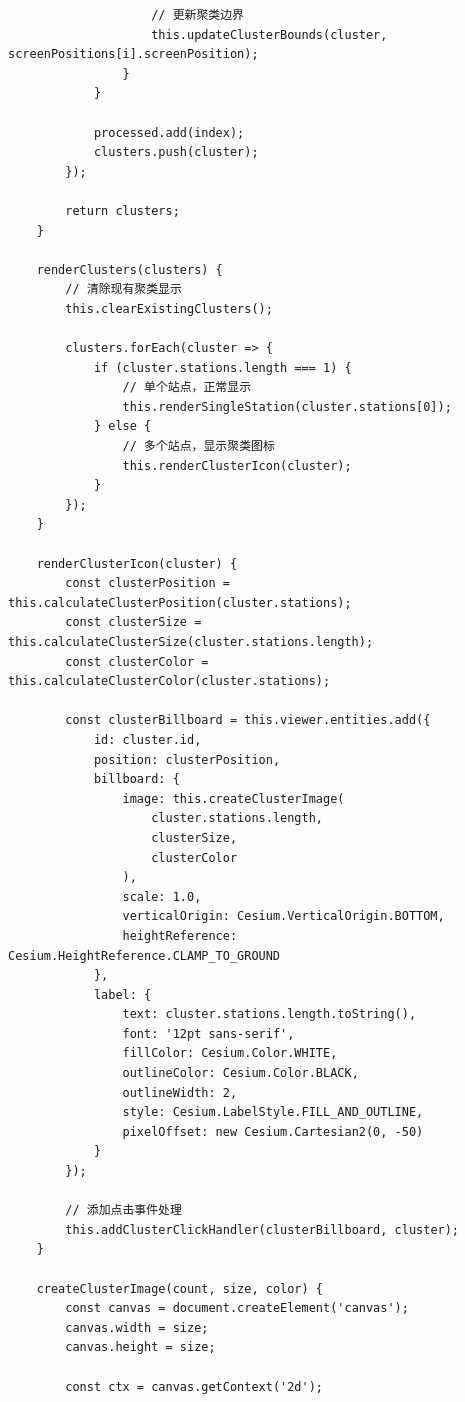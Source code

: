 \begin{lstlisting}
                    // 更新聚类边界
                    this.updateClusterBounds(cluster, screenPositions[i].screenPosition);
                }
            }
            
            processed.add(index);
            clusters.push(cluster);
        });
        
        return clusters;
    }
    
    renderClusters(clusters) {
        // 清除现有聚类显示
        this.clearExistingClusters();
        
        clusters.forEach(cluster => {
            if (cluster.stations.length === 1) {
                // 单个站点，正常显示
                this.renderSingleStation(cluster.stations[0]);
            } else {
                // 多个站点，显示聚类图标
                this.renderClusterIcon(cluster);
            }
        });
    }
    
    renderClusterIcon(cluster) {
        const clusterPosition = this.calculateClusterPosition(cluster.stations);
        const clusterSize = this.calculateClusterSize(cluster.stations.length);
        const clusterColor = this.calculateClusterColor(cluster.stations);
        
        const clusterBillboard = this.viewer.entities.add({
            id: cluster.id,
            position: clusterPosition,
            billboard: {
                image: this.createClusterImage(
                    cluster.stations.length,
                    clusterSize,
                    clusterColor
                ),
                scale: 1.0,
                verticalOrigin: Cesium.VerticalOrigin.BOTTOM,
                heightReference: Cesium.HeightReference.CLAMP_TO_GROUND
            },
            label: {
                text: cluster.stations.length.toString(),
                font: '12pt sans-serif',
                fillColor: Cesium.Color.WHITE,
                outlineColor: Cesium.Color.BLACK,
                outlineWidth: 2,
                style: Cesium.LabelStyle.FILL_AND_OUTLINE,
                pixelOffset: new Cesium.Cartesian2(0, -50)
            }
        });
        
        // 添加点击事件处理
        this.addClusterClickHandler(clusterBillboard, cluster);
    }
    
    createClusterImage(count, size, color) {
        const canvas = document.createElement('canvas');
        canvas.width = size;
        canvas.height = size;
        
        const ctx = canvas.getContext('2d');
        

\end{lstlisting}
